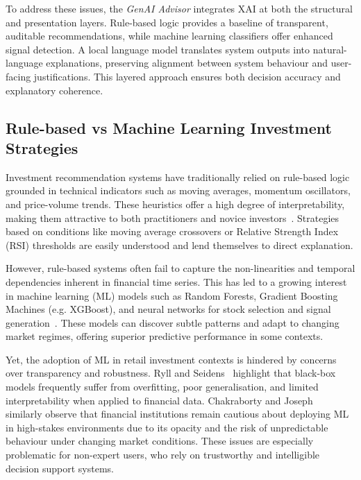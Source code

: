 To address these issues, the \textit{GenAI Advisor} integrates XAI at both the structural and presentation layers. Rule-based logic provides a baseline of transparent, auditable recommendations, while machine learning classifiers offer enhanced signal detection. A local language model translates system outputs into natural-language explanations, preserving alignment between system behaviour and user-facing justifications. This layered approach ensures both decision accuracy and explanatory coherence.

\subsection{Rule-based vs Machine Learning Investment Strategies}

Investment recommendation systems have traditionally relied on rule-based logic grounded in technical indicators such as moving averages, momentum oscillators, and price-volume trends. These heuristics offer a high degree of interpretability, making them attractive to both practitioners and novice investors~\cite{murphy1999technical}. Strategies based on conditions like moving average crossovers or Relative Strength Index (RSI) thresholds are easily understood and lend themselves to direct explanation.

However, rule-based systems often fail to capture the non-linearities and temporal dependencies inherent in financial time series. This has led to a growing interest in machine learning (ML) models such as Random Forests, Gradient Boosting Machines (e.g. XGBoost), and neural networks for stock selection and signal generation~\cite{fischer2018dlfin}. These models can discover subtle patterns and adapt to changing market regimes, offering superior predictive performance in some contexts.

Yet, the adoption of ML in retail investment contexts is hindered by concerns over transparency and robustness. Ryll and Seidens~\cite{ryll2019mlsurvey} highlight that black-box models frequently suffer from overfitting, poor generalisation, and limited interpretability when applied to financial data. Chakraborty and Joseph~\cite{chakraborty2017boe} similarly observe that financial institutions remain cautious about deploying ML in high-stakes environments due to its opacity and the risk of unpredictable behaviour under changing market conditions. These issues are especially problematic for non-expert users, who rely on trustworthy and intelligible decision support systems.

